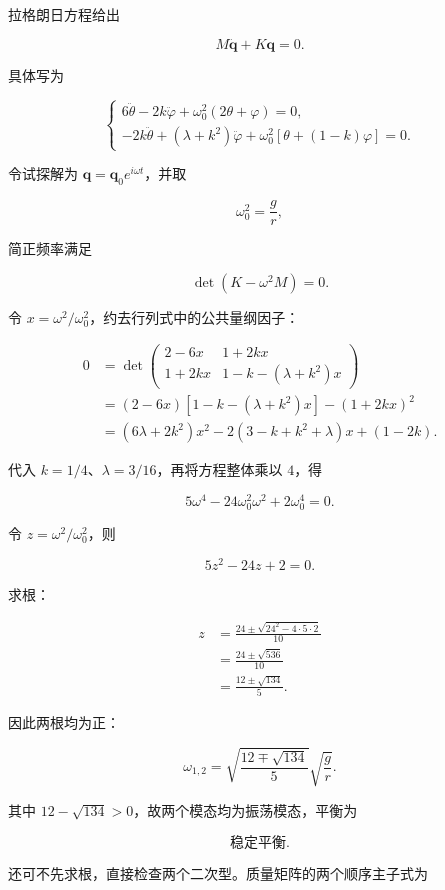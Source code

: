 \documentclass[12pt,a4paper,UTF8]{ctexart}
\begin{document}
拉格朗日方程给出

\[
M\ddot{\boldsymbol q}+K\boldsymbol q=0.
\tag{13}
\]

具体写为

\[
\begin{cases}
6\ddot\theta-2k\ddot\varphi
+\omega_0^2(2\theta+\varphi)=0,\\
-2k\ddot\theta+(\lambda+k^2)\ddot\varphi
+\omega_0^2[\theta+(1-k)\varphi]=0.
\end{cases}
\tag{14}
\]

令试探解为 \(\boldsymbol q=\boldsymbol q_0e^{i\omega t}\)，并取

\[
\omega_0^2=\frac gr,
\tag{15}
\]

简正频率满足

\[
\det(K-\omega^2M)=0.
\tag{16}
\]

令 \(x=\omega^2/\omega_0^2\)，约去行列式中的公共量纲因子：

\[
\begin{aligned}
0
&=\det
\begin{pmatrix}
2-6x&1+2kx\\
1+2kx&1-k-(\lambda+k^2)x
\end{pmatrix}\\
&=(2-6x)[1-k-(\lambda+k^2)x]-(1+2kx)^2\\
&=(6\lambda+2k^2)x^2
-2(3-k+k^2+\lambda)x+(1-2k).
\end{aligned}
\]

代入 \(k=1/4\)、\(\lambda=3/16\)，再将方程整体乘以 \(4\)，得

\[
5\omega^4-24\omega_0^2\omega^2+2\omega_0^4=0.
\]

令 \(z=\omega^2/\omega_0^2\)，则

\[
5z^2-24z+2=0.
\tag{17}
\]

求根：

\[
\begin{aligned}
z
&=\frac{24\pm\sqrt{24^2-4\cdot5\cdot2}}{10}\\
&=\frac{24\pm\sqrt{536}}{10}\\
&=\frac{12\pm\sqrt{134}}5.
\end{aligned}
\tag{18}
\]

因此两根均为正：

\[
\boxed{
\omega_{1,2}
=\sqrt{\frac{12\mp\sqrt{134}}5}\sqrt{\frac gr}
}.
\tag{19}
\]

其中 \(12-\sqrt{134}>0\)，故两个模态均为振荡模态，平衡为

\[
\boxed{\text{稳定平衡}}.
\tag{20}
\]

还可不先求根，直接检查两个二次型。质量矩阵的两个顺序主子式为
\end{document}
